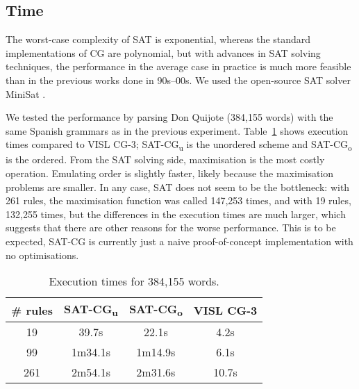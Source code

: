 \documentclass[11pt]{article}
\newcommand{\Mypm}{\mathbin{\tikz [x=1.4ex,y=1.4ex,line width=.1ex] \draw (0.0,0) -- (1.0,0) (0.5,0.08) -- (0.5,0.92) (0.0,0.5) -- (1.0,0.5);}}%
\begin{document}


\subsection{Time}

The worst-case complexity of SAT is exponential, whereas the standard
implementations of CG are polynomial, but with advances in SAT solving
techniques, the performance in the average case in practice is much more feasible than in the previous works done in 90s--00s.
We used the open-source SAT solver MiniSat \cite{een04sat}.


We tested the performance by parsing Don Quijote (384,155 words) with
the same Spanish grammars as in the previous experiment. 
Table~\ref{table:time} shows execution times compared to VISL CG-3;
SAT-CG\textsubscript{u} is the unordered scheme and
SAT-CG\textsubscript{o} is the ordered.
From the SAT solving side, maximisation is the most costly operation. 
Emulating order is slightly faster, likely because the maximisation problems are smaller.
In any case, SAT does not seem to be the bottleneck: with 261 rules,
the maximisation function was called 147,253 times, and with 19 rules,
132,255 times, but 
the differences in the execution times are much larger, which suggests
that there are other reasons for the worse performance. 
This is to be expected, SAT-CG is currently just a naive
proof-of-concept implementation with no optimisations.

\begin{table}
  \centering
  \begin{tabular}{|c|c|c|c|}
     \hline
     \textbf{\# rules} &  \textbf{SAT-CG\textsubscript{u}} & \textbf{SAT-CG\textsubscript{o}} & \textbf{VISL CG-3} \\ \hline
      19   & 39.7s &  22.1s   & 4.2s\\ %
      99   & 1m34.1s & 1m14.9s & 6.1s \\ %
      261  & 2m54.1s & 2m31.6s & 10.7s \\ \hline
  \end{tabular}
  \caption{Execution times for 384,155 words.}
  \label{table:time}
\end{table}
\end{document}

